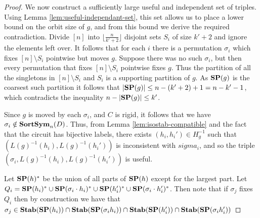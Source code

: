 \documentclass[../paper.tex]{subfiles}
\begin{document}
\begin{proof}
  We now construct a sufficiently large useful and independent set of
  triples.  Using Lemma
  \ref{lem:useful-independant-set}, this set allows us to place a lower
  bound on the orbit size of $g$, and from this bound we derive the required
  contradiction.  Divide $[n]$ into $\lfloor \frac{n}{k' + 2} \rfloor$ disjoint
  sets $S_i$ of size $k' + 2$ and ignore the elements left over. It follows that
  for each $i$ there is a permutation $\sigma_i$ which fixes $[n] \setminus S_i$
  pointwise but moves $g$. Suppose there was no such $\sigma_i$, but then every
  permutation that fixes $[n]\setminus S_i$ pointwise fixes $g$. Thus the partition of
  all the singletons in $[n]\setminus S_i$ and $S_i$ is a supporting
  partition of $g$.  As
  $\text{\textbf{SP}}(g)$ is the coarsest such partition it follows that $\vert \text{\textbf{SP}}(g) \vert \leq n
  - (k'+2) + 1 = n - k' - 1$, which contradicts the inequality $n - \vert \text{\textbf{SP}}(g)
  \vert \leq k'$.

  Since $g$ is moved by each $\sigma_i$, and $C$ is rigid, it follows that we
  have $\sigma_i \notin \text{\textbf{SortSym}}_n(D)$. Thus, from Lemma
  \ref{lem:isostab-compatible} and the fact that the circuit has bijective
  labels, there exists $(h_i, h_i') \in H^{-1}_g$ such that $(L(g)^{-1}(h_i),
  L(g)^{-1}(h_i'))$ is inconsistent with $sigma_i$, and so the triple
  $(\sigma_i, L(g)^{-1}(h_i), L(g)^{-1}(h_i'))$ is useful.

  Let $\text{\textbf{SP}} (h)^*$ be the union of all parts of $\text{\textbf{SP}}(h)$ except for the largest
  part. Let $Q_i = \text{\textbf{SP}}(h_i)^* \cup \text{\textbf{SP}}(\sigma_i \cdot h_i)^* \cup \text{\textbf{SP}} (h_i')^*
  \cup \text{\textbf{SP}} (\sigma_i \cdot h_i')^*$. Then note that if $\sigma_j$ fixes $Q_i$
  then by construction we have that $\sigma_j \in \text{\textbf{Stab}}(\text{\textbf{SP}}(h_i)) \cap
  \text{\textbf{Stab}}(\text{\textbf{SP}}(\sigma_i h_i)) \cap \text{\textbf{Stab}}(\text{\textbf{SP}}(h_i')) \cap \text{\textbf{Stab}}(\text{\textbf{SP}}(\sigma_i h_i'))$


\end{proof}
\end{document}
